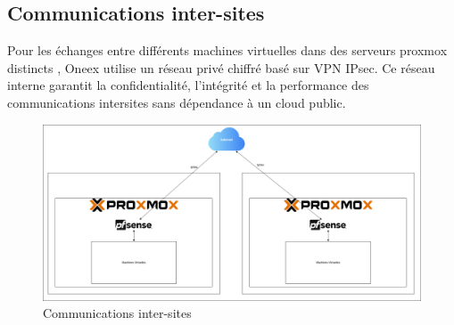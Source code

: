 \subsection{Communications inter-sites}

Pour les échanges entre différents machines virtuelles dans des serveurs proxmox distincts , Oneex utilise un réseau privé chiffré basé sur VPN IPsec. Ce réseau interne garantit la confidentialité, l’intégrité et la performance des communications intersites sans dépendance à un cloud public.

\begin{figure} [H]
	\centering
	\includegraphics[width=.5\textwidth]{figures/Reseau intra proxmox.png}
	\caption{Communications inter-sites}
\end{figure}
